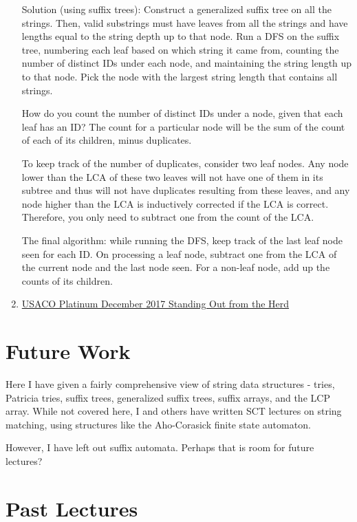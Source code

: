 \documentclass[11pt, oneside]{article}
\begin{document}
\begin{enumerate}
  Solution (using suffix trees): Construct a generalized suffix tree on all the strings.
  Then, valid substrings must have leaves from all the strings
  and have lengths equal to the string depth up to that node. Run a DFS on the suffix tree,
  numbering each leaf based on which string it came from, counting the number of distinct IDs under each node, and maintaining the string length up to that node.
  Pick the node with the largest string length that contains all strings.

  How do you count the number of distinct IDs under a node, given that each leaf has an ID?
  The count for a particular node will be the sum of the count of each of its children, minus duplicates.

  To keep track of the number of duplicates, consider two leaf nodes. Any node lower than the LCA
  of these two leaves will not have one of them in its subtree and thus will not have duplicates resulting
  from these leaves, and any node higher than the LCA is inductively corrected if the LCA is correct.
  Therefore, you only need to subtract one from the count of the LCA.

  The final algorithm: while running the DFS, keep track of the last leaf node seen for each ID.
  On processing a leaf node, subtract one from the LCA of the current node and the last node seen.
  For a non-leaf node, add up the counts of its children.

  \item \href{http://www.usaco.org/index.php?page=viewproblem2&cpid=768}{USACO Platinum December 2017 Standing Out from the Herd}

\end{enumerate}

\newpage

\section{Future Work}
Here I have given a fairly comprehensive view of string data structures - tries,
Patricia tries, suffix trees, generalized suffix trees, suffix arrays, and the LCP array. While not covered here, I and others have written SCT lectures on string matching,
using structures like the Aho-Corasick finite state automaton.

However, I have left out suffix automata. Perhaps that is room for future lectures?

\section{Past Lectures}
\end{document}
